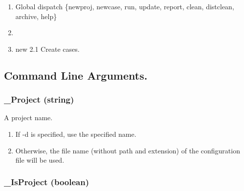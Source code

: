 \documentclass[]{article}
\begin{document}
\begin{enumerate}
\def\labelenumi{\arabic{enumi}.}
\item
  Global dispatch \{newproj, newcase, run, update, report, clean,
  distclean, archive, help\}
\item
\item
  new 2.1 Create cases.
\end{enumerate}

\subsection{Command Line Arguments.}\label{command-line-arguments.}

\subsubsection{\_Project (string)}\label{project-string}

A project name.

\begin{enumerate}
\def\labelenumi{\arabic{enumi}.}
\itemsep1pt\parskip0pt
\item
  If -d is specified, use the specified name.
\item
  Otherwise, the file name (without path and extension) of the
  configuration file will be used.
\end{enumerate}

\subsubsection{\_IsProject (boolean)}\label{isproject-boolean}
\end{document}

